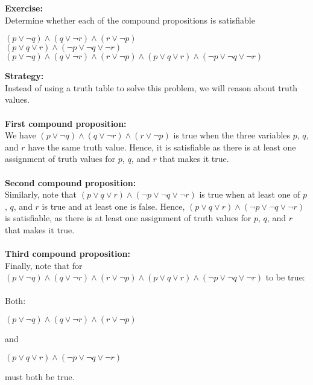 \newpage
\begin{tcolorbox}[title=Example 1: Satisfiable compound propositions]
\textbf{Exercise:}  
\\ Determine whether each of the compound propositions is satisfiable
\begin{center}
$(p\lor \neg q) \land (q \lor \neg r) \land (r \lor \neg p)$ \\ 
$(p\lor q \lor r) \land (\neg p \lor \neg q \lor \neg r)$
\\
$(p\lor \neg q) \land (q \lor \neg r) \land (r \lor \neg p) \land (p \lor q \lor r) \land (\neg p \lor \neg q \lor \neg r)$
\end{center}

\textbf{Strategy:}  \\
Instead of using a truth table to solve this problem, we will reason about truth values. \\ \\
\textbf{First compound proposition:} \\
We have $(p\lor \neg q) \land (q \lor \neg r) \land (r \lor \neg p)$ is true when the three variables $p$, $q$, and $r$ have the same truth value.
Hence, it is satisfiable as there is at least
one assignment of truth values for $p$, $q$, and $r$ that makes it true.
\\ \\
\textbf{Second compound proposition:} \\
Similarly, note that $(p\lor q \lor r) \land (\neg p \lor \neg q \lor \neg r)$ is true when at least one of $p$, $q$, and $r$ is true and at least one is false. Hence, $(p\lor q \lor r) \land (\neg p \lor \neg q \lor \neg r)$ is satisfiable, as there is at least
one assignment of truth values for $p$, $q$, and $r$ that makes it true. \\ \\
\textbf{Third compound proposition:} \\
Finally, note that for $(p\lor \neg q) \land (q \lor \neg r) \land (r \lor \neg p) \land (p \lor q \lor r) \land (\neg p \lor \neg q \lor \neg r)$ to be true:
\\ \\ Both: 
\begin{center}
$(p\lor \neg q) \land (q \lor \neg r) \land (r \lor \neg p)$    
\end{center}
and 
\begin{center}
 $(p \lor q \lor r) \land (\neg p \lor \neg q \lor \neg r)$   
\end{center}
must both be true. 

\end{tcolorbox}
